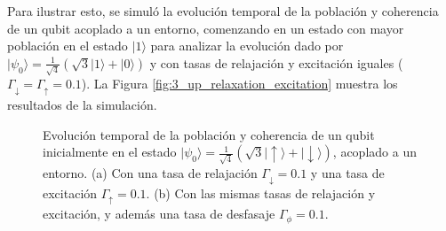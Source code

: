 Para ilustrar esto, se simuló la evolución temporal de la población y coherencia de un qubit acoplado a un entorno, comenzando en un estado con mayor población en el estado \(|1\rangle\) para analizar la evolución dado por \(|\psi_0\rangle = \frac{1}{\sqrt{4}} (\sqrt{3}|1\rangle + |0\rangle)\)  y con tasas de relajación y excitación iguales (\(\Gamma_\downarrow = \Gamma_\uparrow = 0.1\)). La Figura \ref{fig:3_up_relaxation_excitation} muestra los resultados de la simulación.

\begin{figure}[htbp]
    \centering
    \hfill
    \caption{Evolución temporal de la población y coherencia de un qubit inicialmente en el estado \(|\psi_0\rangle = \frac{1}{\sqrt{4}} (\sqrt{3}|\uparrow\rangle + |\downarrow\rangle)\), acoplado a un entorno.  
    (a) Con una tasa de relajación \(\Gamma_\downarrow = 0.1\) y una tasa de excitación \(\Gamma_\uparrow = 0.1\).  
    (b) Con las mismas tasas de relajación y excitación, y además una tasa de desfasaje \(\Gamma_\phi = 0.1\).}
    \label{fig:qubit_evolution}
\end{figure}




